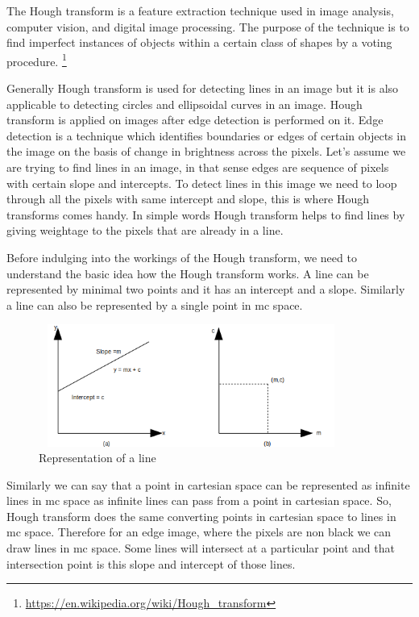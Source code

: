     The Hough transform is a feature extraction technique used in image analysis, computer vision, and digital image processing. The purpose of the technique is to find imperfect instances of objects within a certain class of shapes by a voting procedure. \footnote{\url{https://en.wikipedia.org/wiki/Hough_transform}}
    
    Generally Hough transform is used for detecting lines in an image but it is also applicable to detecting circles and ellipsoidal curves in an image. Hough transform is applied on images after edge detection is performed on it. Edge detection is a technique which identifies boundaries or edges of certain objects in the image on the basis of change in brightness across the pixels. Let's assume we are trying to find lines in an image, in that sense edges are sequence of pixels with certain slope and intercepts. To detect lines in this image we need to loop through all the pixels with same intercept and slope, this is where Hough transforms comes handy. In simple words Hough transform helps to find lines by giving weightage to the pixels that are already in a line. 
    
    Before indulging into the workings of the Hough transform, we need to understand the basic idea how the Hough transform works. A line can be represented by minimal two points and it has an intercept and a slope. Similarly a line can also be represented by a single point in mc space.
    
                \begin{figure}[h]
    \centering
    \includegraphics[width=10cm, height =4cm]{images/hough1.png}
    \caption{Representation of a line}
    \end{figure}
    
    Similarly we can say that a point in cartesian space can be represented as infinite lines in mc space as infinite lines can pass from a point in cartesian space. So, Hough transform does the same converting points in cartesian space to lines in mc space. Therefore for an edge image, where the pixels are non black we can draw lines in mc space. Some lines will intersect at a particular point and that intersection point is this slope and intercept of those lines. 
    
